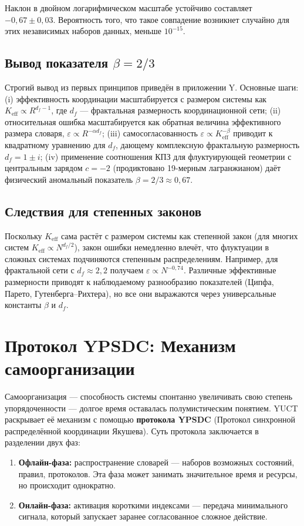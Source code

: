 \documentclass[11pt]{article}
\theoremstyle{remark}
\newcommand{\Keff}{K_{\mathrm{eff}}}
\begin{document}
	Наклон в двойном логарифмическом масштабе устойчиво составляет \(-0,67 \pm 0,03\). Вероятность того, что такое совпадение возникнет случайно для этих независимых наборов данных, меньше \(10^{-15}\).
	
	\subsection{Вывод показателя \(\beta = 2/3\)}
	
	Строгий вывод из первых принципов приведён в приложении Y. Основные шаги: (i) эффективность координации масштабируется с размером системы как \(\Keff \propto R^{d_f-1}\), где \(d_f\) — фрактальная размерность координационной сети; (ii) относительная ошибка масштабируется как обратная величина эффективного размера словаря, \(\varepsilon \propto R^{-\alpha d_f}\); (iii) самосогласованность \(\varepsilon \propto \Keff^{-\beta}\) приводит к квадратному уравнению для \(d_f\), дающему комплексную фрактальную размерность \(d_f = 1 \pm i\); (iv) применение соотношения КПЗ для флуктуирующей геометрии с центральным зарядом \(c=-2\) (продиктовано 19-мерным лагранжианом) даёт физический аномальный показатель \(\beta = 2/3 \approx 0,67\).
	
	\subsection{Следствия для степенных законов}
	
	Поскольку \(\Keff\) сама растёт с размером системы как степенной закон (для многих систем \(\Keff \propto N^{d_f/2}\)), закон ошибки немедленно влечёт, что флуктуации в сложных системах подчиняются степенным распределениям. Например, для фрактальной сети с \(d_f \approx 2,2\) получаем \(\varepsilon \propto N^{-0,74}\). Различные эффективные размерности приводят к наблюдаемому разнообразию показателей (Ципфа, Парето, Гутенберга–Рихтера), но все они выражаются через универсальные константы \(\beta\) и \(d_f\).
	
	\section{Протокол YPSDC: Механизм самоорганизации}
	\label{sec:ypsdc}
	
	Самоорганизация — способность системы спонтанно увеличивать свою степень упорядоченности — долгое время оставалась полумистическим понятием. YUCT раскрывает её механизм с помощью \textbf{протокола YPSDC} (Протокол синхронной распределённой координации Якушева). Суть протокола заключается в разделении двух фаз:
	\begin{enumerate}
		\item \textbf{Офлайн-фаза:} распространение словарей — наборов возможных состояний, правил, протоколов. Эта фаза может занимать значительное время и ресурсы, но происходит однократно.
		\item \textbf{Онлайн-фаза:} активация короткими индексами — передача минимального сигнала, который запускает заранее согласованное сложное действие.
	\end{enumerate}
	
\end{document}
